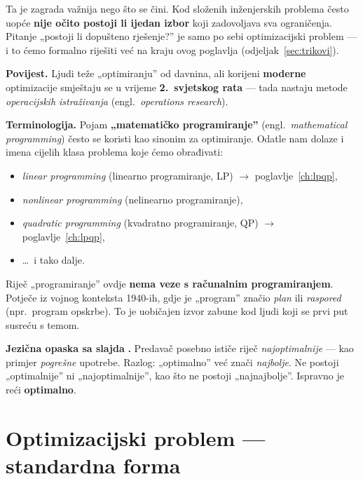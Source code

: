 Ta je zagrada važnija nego što se čini. Kod složenih inženjerskih problema
često uopće \textbf{nije očito postoji li ijedan izbor} koji zadovoljava sva
ograničenja. Pitanje „postoji li dopušteno rješenje?” je samo po sebi
optimizacijski problem --- i to ćemo formalno riješiti već na kraju ovog
poglavlja (odjeljak~\ref{sec:trikovi}).

\textbf{Povijest.} Ljudi teže „optimiranju” od davnina, ali korijeni
\textbf{moderne} optimizacije smještaju se u vrijeme \textbf{2.\ svjetskog
rata} --- tada nastaju metode \emph{operacijskih istraživanja} (engl.\
\emph{operations research}).

\textbf{Terminologija.} Pojam \textbf{„matematičko programiranje”} (engl.\
\emph{mathematical programming}) često se koristi kao sinonim za optimiranje.
Odatle nam dolaze i imena cijelih klasa problema koje ćemo obrađivati:

\begin{itemize}
  \item \emph{linear programming} (linearno programiranje, LP)
        $\to$ poglavlje~\ref{ch:lpqp},
  \item \emph{nonlinear programming} (nelinearno programiranje),
  \item \emph{quadratic programming} (kvadratno programiranje, QP)
        $\to$ poglavlje~\ref{ch:lpqp},
  \item \dots\ i tako dalje.
\end{itemize}

\begin{napomena}
Riječ „programiranje” ovdje \textbf{nema veze s računalnim programiranjem}.
Potječe iz vojnog konteksta 1940-ih, gdje je „program” značio \emph{plan} ili
\emph{raspored} (npr.\ program opskrbe). To je uobičajen izvor zabune kod ljudi
koji se prvi put susreću s temom.
\end{napomena}

\textbf{Jezična opaska sa slajda} \textbf{.} Predavač posebno ističe
riječ \emph{najoptimalnije} --- kao primjer \emph{pogrešne} upotrebe. Razlog:
„optimalno” već znači \emph{najbolje}. Ne postoji „optimalnije” ni
„najoptimalnije”, kao što ne postoji „najnajbolje”. Ispravno je reći
\textbf{optimalno}.

\section{Optimizacijski problem --- standardna forma}
\label{sec:standardna-forma}
\str{8--9}

